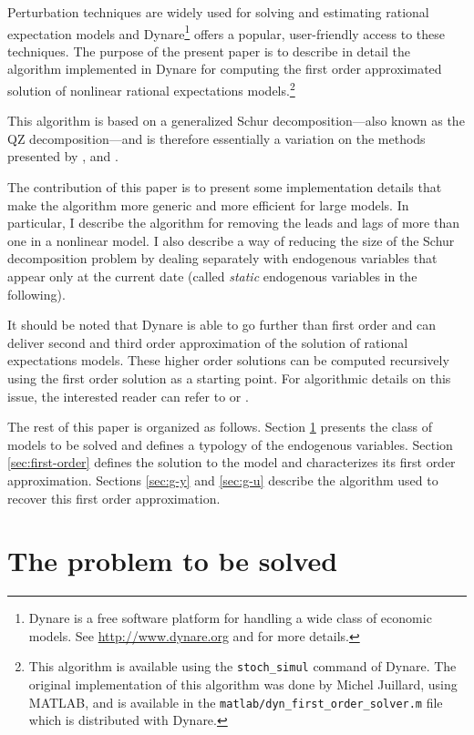 \documentclass[11pt,a4paper]{article}
\begin{document}
Perturbation techniques are widely used for solving and estimating rational
expectation models and Dynare\footnote{Dynare is a free software platform for
  handling a wide class of economic models. See \url{http://www.dynare.org} and
  \citet{adjemian/al:2011} for more details.} offers a popular, user-friendly
access to these techniques. The purpose of the present paper is to describe in
detail the algorithm implemented in Dynare for computing the first order
approximated solution of nonlinear rational expectations models.\footnote{This
  algorithm is available using the \texttt{stoch\_simul} command of Dynare. The
  original implementation of this algorithm was done by Michel Juillard, using
  MATLAB, and is available in the \texttt{matlab/dyn\_first\_order\_solver.m} file which is
  distributed with Dynare.}

This algorithm is based on a generalized Schur decomposition---also known as
the QZ decomposition---and is therefore essentially a variation on the
methods presented by \citet{klein:2000}, \citet{sims:2001} and
\citet{uhlig:1999}.

The contribution of this paper is to present some implementation details that
make the algorithm more generic and more efficient for large models. In
particular, I describe the algorithm for removing the leads and lags of more
than one in a nonlinear model. I also describe a way of reducing the size of
the Schur decomposition problem by dealing separately with endogenous variables
that appear only at the current date (called \emph{static} endogenous variables
in the following).

It should be noted that Dynare is able to go further than first order and can
deliver second and third order approximation of the solution of rational
expectations models. These higher order solutions can be computed recursively
using the first order solution as a starting point. For algorithmic details on
this issue, the interested reader can refer to
\citet{collard/juillard:2001:compecon} or \citet{schmitt-grohe/uribe:2004}.

The rest of this paper is organized as follows. Section \ref{sec:model}
presents the class of models to be solved and defines a typology of the
endogenous variables. Section \ref{sec:first-order} defines the solution
to the model and characterizes its first order approximation. Sections
\ref{sec:g-y} and \ref{sec:g-u} describe the algorithm used to recover this
first order approximation.

\section{The problem to be solved}
\label{sec:model}
\end{document}
